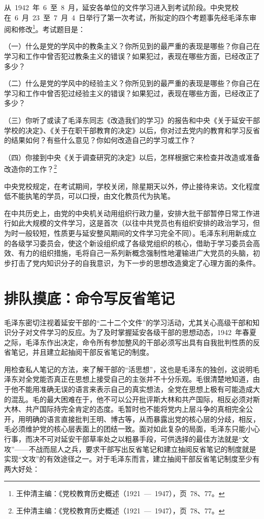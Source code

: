 从~1942~年~6~至~8~月，延安各单位的文件学习进入到考试阶段。中央党校在~6~月~23~至~7~月~4~日举行了第一次考试，所拟定的四个考题事先经毛泽东审阅和修改\footnote{王仲清主编：《党校教育历史概述（1921~—~1947），页~78、77。}。考试题目是：

（一）什么是党的学风中的教条主义？你所见到的最严重的表现是哪些？你自己在学习和工作中曾否犯过教条主义的错误？如果犯过，表现在哪些方面，已经改正了多少？

（二）什么是党的学风中的经验主义？你所见到的最严重的表现是哪些？你自己在学习和工作中曾否犯过经验主义的错误？如果犯过，表现在哪些方面，已经改正了多少？

（三）你听了或读了毛泽东同志《改造我们的学习》的报告和中央《关于延安干部学校的决定》、《关于在职干部教育的决定》以后，你对过去党内的教育和学习反省的结果如何？有些什么意见？你如何改造自己的学习或工作？

（四）你接到中央《关于调查研究的决定》以后，怎样根据它来检查并改造或准备改造你的工作？\footnote{王仲清主编：《党校教育历史概述（1921~—~1947），页~78、77。}

中央党校规定，在考试期间，学校关闭，除星期天以外，停止接待来访。文化程度低不能执笔的学员，可以口授，由文化教员代为执笔。

在中共历史上，由党的中央机关动用组织行政力量，安排大批干部暂停日常工作进行如此大规模的文件学习，这是首次（以往中共党员也有组织安排的政治学习，但为时一般较短，性质更与延安整风期间的文件学习完全不同）。毛泽东利用新成立的各级学习委员会，使这个新设组织成了各级党组织的核心，借助于学习委员会高效、有力的组织措施，毛将自己一系列新概念强制性地灌输进广大党员的头脑，初步打击了党内知识分子的自我意识，为下一步的思想改造奠定了心理方面的条件。

\section{排队摸底：命令写反省笔记}

毛泽东密切注视着延安干部的“二十二个文件”的学习活动，尤其关心高级干部和知识分子对文件学习的反应。为了及时掌握延安各级干部的思想动态，1942~年春夏之际，毛泽东作出决定，命令所有参加整风的干部必须写出具有自我批判性质的反省笔记，并且建立起抽阅干部反省笔记的制度。

用检查私人笔记的方法，来了解干部的“活思想”，这也是毛泽东的独创，这说明毛泽东对全党能否真正在思想上接受自己的主张并不十分乐观。毛很清楚地知道，由于他不能用准确无误的语言来表示自己的真实想法，全党在思想上极有可能造成大的混乱。毛的最大困难在于，他不可以公开批评斯大林和共产国际，相反必须对斯大林、共产国际持完全肯定的态度。毛暂时也不能将党内上层斗争的真相完全公开，用明确的语言直接批判王明、博古等，从而暴露出党的核心层的分歧，相反，毛必须维护党的核心层表面上的团结一致。面对如此复杂的局面，毛泽东只能小心行事，而决不可对延安干部草率处之以粗暴手段，可供选择的最佳方法就是“文攻”——不战而屈人之兵，要求干部写出反省笔记和建立抽阅反省笔记的制度就是实现“文攻”的有效途径之一。对于毛泽东而言，建立抽阅干部反省笔记制度至少有两大好处：

